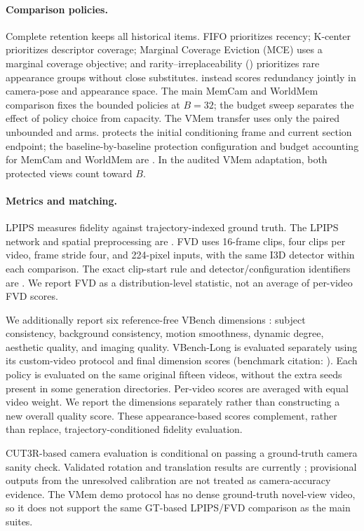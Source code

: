 \paragraph{Comparison policies.}
Complete retention keeps all historical items. FIFO prioritizes recency;
K-center prioritizes descriptor coverage; Marginal Coverage Eviction (MCE)
uses a marginal coverage objective; and rarity--irreplaceability (\RI)
prioritizes rare appearance groups without close substitutes. \Geo instead
scores redundancy jointly in camera-pose and appearance space. The main
MemCam and WorldMem comparison fixes the bounded policies at $B=32$; the budget
sweep separates the effect of policy choice from capacity. The VMem transfer
uses only the paired unbounded and  arms.
\Geo protects the initial conditioning frame and current section endpoint;
the baseline-by-baseline protection configuration and budget accounting for
MemCam and WorldMem are \TBD. In the audited VMem adaptation, both protected
views count toward $B$.

\paragraph{Metrics and matching.}
LPIPS \citep{lpips} measures fidelity against trajectory-indexed ground truth.
The LPIPS network and spatial preprocessing are \TBD. FVD \citep{fvd} uses
16-frame clips, four clips per video, frame stride four, and 224-pixel inputs,
with the same I3D detector within each comparison. The exact clip-start rule
and detector/configuration identifiers are \TBD. We report FVD as a
distribution-level statistic, not an average of per-video FVD scores.

We additionally report six reference-free VBench dimensions \citep{vbench}:
subject consistency, background consistency, motion smoothness, dynamic degree,
aesthetic quality, and imaging quality. VBench-Long is evaluated separately
using its custom-video protocol and final dimension scores (benchmark citation:
\TBD). Each policy is evaluated on the same original fifteen videos, without
the extra seeds present in some generation directories. Per-video scores are
averaged with equal video weight. We report the dimensions separately rather
than constructing a new overall quality score. These appearance-based scores
complement, rather than replace, trajectory-conditioned fidelity evaluation.

CUT3R-based camera evaluation \citep{cut3r} is conditional on passing a
ground-truth camera sanity check. Validated rotation and translation results
are currently \TBD; provisional outputs from the unresolved calibration are
not treated as camera-accuracy evidence. The VMem demo protocol has no dense
ground-truth novel-view video, so it does not support the same GT-based
LPIPS/FVD comparison as the main suites.

